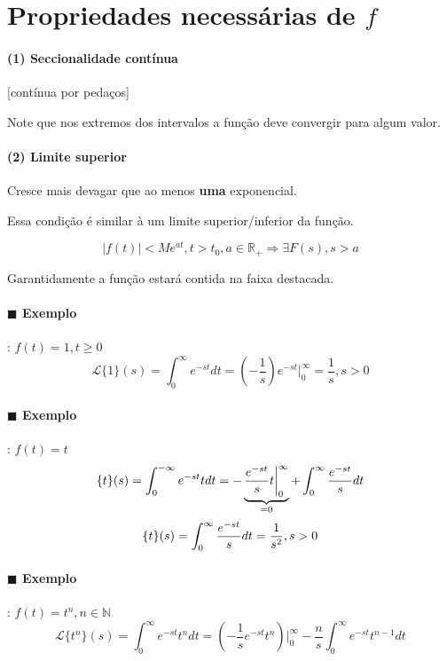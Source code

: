 \section{Propriedades necessárias de $f$}

\paragraph{(1) Seccionalidade contínua} [contínua por pedaços]




Note que nos extremos dos intervalos a função deve convergir para algum valor.


\paragraph{(2) Limite superior} Cresce mais devagar que ao menos \textbf{uma} exponencial.

Essa condição é similar à um limite superior/inferior da função.

$$ |f(t) | < M e^{at} , t > t_0, a \in \mathbb{R}_+  \Longrightarrow  \exists F(s), s > a  $$


Garantidamente a função estará contida na faixa destacada.




\paragraph{$\blacksquare$ Exemplo}: $f(t) = 1, t \geq 0$
$$ \mathcal{L} \{ 1 \} (s)  = \int_{0}^{\infty} e^{-st} dt = \left( - \frac{1}{s} \right) e^{-st} \bigg|_{0}^{\infty} =
\frac{1}{s}, s > 0$$
\paragraph{$\blacksquare$ Exemplo}: $f(t) = t$
$$ \mathcal\{ t \} (s) = \int_{0}^{-\infty} e^{-st} t dt = - \underbrace{\frac{e^{-st}}{s} t
  \bigg | _{0}^{\infty}}_{= 0} + \int_{0}^{\infty}
\frac{e^{-st}}{s} dt  $$
$$  \mathcal\{ t \} (s) = \int_{0}^{\infty} \frac{e^{-st}}{s} dt = \frac{1}{s^2} , s > 0 $$
\paragraph{$\blacksquare$ Exemplo}: $f(t) = t^n, n \in \mathbb{N}$
$$ \mathcal{L} \{ t^n \} (s) = \int_{0}^{\infty} e^{-st} t^n dt = \left( - \frac{1}{s} e^{-st} t^n \right)
\bigg|_{0}^{\infty} - \frac{n}{s} \int_{0}^{\infty} e^{-st} t^{n - 1} dt  $$

